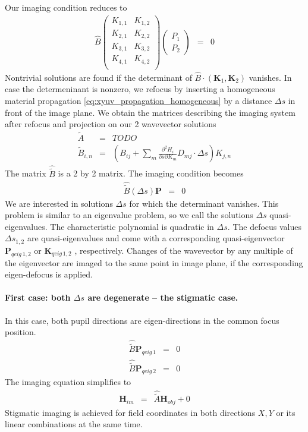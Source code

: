 \documentclass[12pt,a4paper,twoside,openright,BCOR10mm,headsepline,titlepage,abstracton,chapterprefix,final]{scrreprt}
\newcommand\Vector[1]{{\mathbf{#1}}}
\begin{document}
Our imaging condition reduces to
\begin{eqnarray}
 \hat{B}
 \begin{pmatrix}
 K_{1,1} & K_{1,2} \\
 K_{2,1} & K_{2,2} \\
 K_{3,1} & K_{3,2} \\
 K_{4,1} & K_{4,2} \\ 
 \end{pmatrix}
 \begin{pmatrix}
 P_1 \\ P_2 
 \end{pmatrix}
 &=& 0
\end{eqnarray}
Nontrivial solutions are found if the determinant of $\hat{B} \cdot(\Vector{K}_1, \Vector{K}_2)$ vanishes.
In case the determeninant is nonzero, 
we refocus by inserting a homogeneous material propagation \eqref{eq:xyuv_propagation_homogeneous} by a distance $\Delta s$ 
in front of the image plane.
We obtain the matrices describing the imaging system after refocus and projection on our 2 wavevector solutions
\begin{eqnarray}
 \tilde{A} &=& TODO \\
 \tilde{B}_{i,n} &=& \left( B_{ij} + \sum_m \frac{\partial^2 H_i}{\partial s \partial K_m} D_{mj} \cdot \Delta s \right) K_{j,n}
\end{eqnarray}
The matrix $\hat{\tilde{B}}$ is a 2 by 2 matrix.
The imaging condition becomes
\begin{eqnarray}
 \hat{\tilde{B}}(\Delta s) \Vector{P} &=& 0
\end{eqnarray}
We are interested in solutions $\Delta s$ for which the determinant vanishes.
This problem is similar to an eigenvalue problem, so we call the solutions $\Delta s$ quasi-eigenvalues.
The characteristic polynomial is quadratic in $\Delta s$.
The defocus values $\Delta s_{1,2}$ are quasi-eigenvalues 
and come with a corresponding quasi-eigenvector $\Vector{P}_{qeig\,1,2}$ or $\Vector{K}_{qeig\,1,2}$ , respectively.
Changes of the wavevector by any multiple of the eigenvector are imaged to the same point in image plane, 
if the corresponding eigen-defocus is applied.

\paragraph{First case: both $\Delta s$ are degenerate -- the stigmatic case.}
In this case, both pupil directions are eigen-directions in the common focus position.
\begin{eqnarray}
 \hat{\tilde{B}} \Vector{P}_{qeig\,1} &=& 0 \\
 \hat{\tilde{B}} \Vector{P}_{qeig\,2} &=& 0
\end{eqnarray}
The imaging equation simplifies to
\begin{eqnarray}
 \Vector{H}_{im} &=& \hat{\tilde{A}} \Vector{H}_{obj} + 0
\end{eqnarray}
Stigmatic imaging is achieved for field coordinates in both directions $X,Y$ or its linear combinations at the same time.
\end{document}
